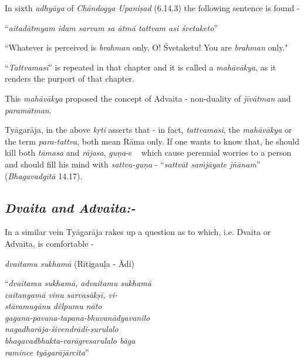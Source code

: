 In sixth \textit{adhyāya} of \textit{Chāndogya Upaniṣad} (6.14.3) the following sentence is found -

\begin{myquote}
\qquad\qquad“\textit{aitadātmyam idam sarvam sa ātmā tattvam asi śvetaketo}”
\end{myquote}

``Whatever is perceived is \textit{brahman} only, O! Śvetaketu! You are \textit{brahman} only."

“\textit{Tattvamasi}” is repeated in that chapter and it is called a \textit{mahāvākya}, as it renders the purport of that chapter.

This \textit{mahāvākya} proposed the concept of Advaita - non-duality of \textit{jīvātman} and \textit{paramātman}.

Tyāgarāja, in the above \textit{kṛti} asserts that - in fact, \textit{tattvamasi}, the \textit{mahāvākya} or the term \textit{para-tattva}, both mean Rāma only. If one wants to know that, he should kill both \textit{tāmasa} and \textit{rājasa}, \textit{guṇa}-s   which cause perennial worries to a person and should fill his mind with \textit{sattva-guṇa} - “\textit{sattvāt saṁjāyate jñānam}” (\textit{Bhagavadgītā} 14.17).


\subsection*{\textit{Dvaita and Advaita:-}}

In a similar vein Tyāgarāja rakes up a question as to which, i.e. Dvaita or Advaita, is comfortable - 

\textit{dvaitamu sukhamā} (Rītigauḷa - Ādi)

\begin{centerquote}
“\textit{dvaitamu sukhamā, advaitamu sukhamā}\\ \textit{caitanyamā vinu sarvasākṣī, vi-}\\ \textit{stāramugānu dêlpumu nāto}\\ \textit{gagana-pavana-tapana-bhuvanādyavanilo}\\ \textit{nagadharāja-śivendrādi-surulalo}\\ \textit{bhagavadbhakta-varāgresarulalo bāga}\\ \textit{ramince tyāgarājārcita}”
\end{centerquote}

